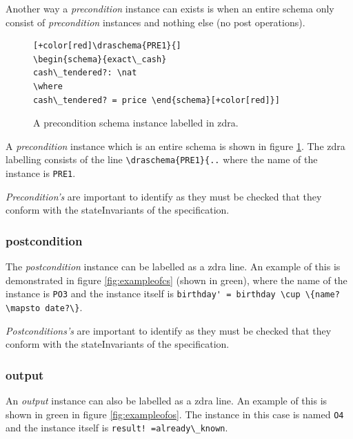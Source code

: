 Another way a \emph{precondition} instance can exists is when an entire schema
only consist of \emph{precondition} instances and nothing else (no post
operations).

\begin{figure}[H]
\centering
\begin{footnotesize}
\begin{BVerbatim}[commandchars=+\[\]]
[+color[red]\draschema{PRE1}{]
\begin{schema}{exact\_cash}
cash\_tendered?: \nat
\where
cash\_tendered? = price \end{schema}[+color[red]}]
\end{BVerbatim}
\end{footnotesize}
\caption{\label{fig:exampleofpre} A precondition schema instance labelled in \gls{zdra}.}
\end{figure}

A \emph{precondition} instance which is an entire schema is shown in figure
\ref{fig:exampleofpre}. The \gls{zdra} labelling consists of the line
\verb|\draschema{PRE1}{..| where the name of the instance is \verb|PRE1|.

\emph{Precondition's} are important to identify as they must be checked that they
conform with the stateInvariants of the specification.

\subsubsection{postcondition}

The \emph{postcondition} instance can be labelled as a \gls{zdra} line. An
example of this is demonstrated in figure \ref{fig:exampleofcs} (shown in
green), where the name of the instance is \verb|PO3| and the instance itself is
\verb|birthday' = birthday \cup \{name? \mapsto date?\}|.

\emph{Postconditions's} are important to identify as they must be checked that they
conform with the stateInvariants of the specification.

\subsubsection{output}

An \emph{output} instance can also be labelled as a \gls{zdra} line. An example
of this is shown in green in figure \ref{fig:exampleofos}. The instance in this
case is named
 \verb|O4| and the instance itself is \verb|result! =already\_known|.

